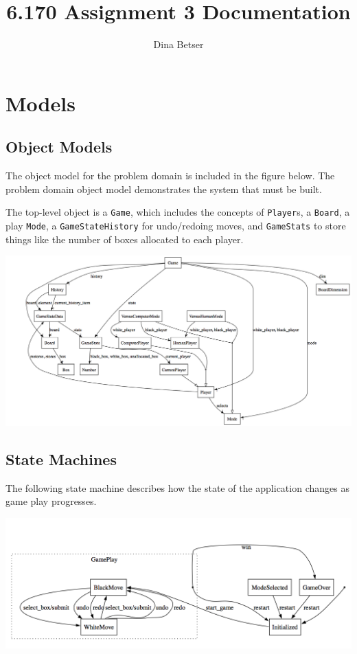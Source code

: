 \documentclass[11pt,letterpaper]{article}
\title{6.170 Assignment 3 Documentation}
\author{Dina Betser}
\begin{document}
\maketitle

\section{Models}
\subsection{Object Models}
The object model for the problem domain is included in the figure below. The problem domain object model demonstrates the system that must be built. 

The top-level object is a \texttt{Game}, which includes the concepts of \texttt{Player}s, a \texttt{Board}, a play \texttt{Mode}, a \texttt{GameStateHistory} for undo/redoing moves, and \texttt{GameStats} to store things like the number of boxes allocated to each player.
\begin{center}
\includegraphics[width=10.5in, angle=90]{dot/obmod.png}
\label{fig:ob1} 
\end{center}

\subsection{State Machines}
The following state machine describes how the state of the application changes as game play progresses.
\begin{center}
\includegraphics[width=7in]{dot/statediag.png}
\label{fig:sm1} 
\end{center}
\end{document}
